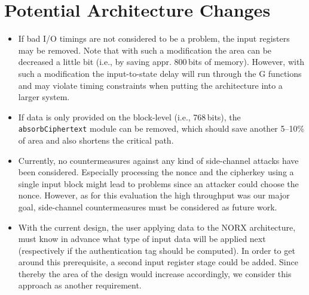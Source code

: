\documentclass[%
 halfparskip
]{scrartcl}
\begin{document}
\section{Potential Architecture Changes}

\begin{itemize}
\item If bad I/O timings are not considered to be a problem, the input
  registers may be removed. Note that with such a modification the
  area can be decreased a little bit (i.e., by saving appr. 800\,bits
  of memory). However, with such a modification the input-to-state
  delay will run through the G functions and may violate timing
  constraints when putting the architecture into a larger system.
\item If data is only provided on the block-level (i.e., 768\,bits),
  the \texttt{absorbCiphertext} module can be removed, which should
  save another 5--10\% of area and also shortens the critical path.
\item Currently, no countermeasures against any kind of side-channel
  attacks have been considered. Especially processing the nonce and
  the cipherkey using a single input block might lead to problems
  since an attacker could choose the nonce. However, as for this
  evaluation the high throughput was our major goal, side-channel
  countermeasures must be considered as future work.
\item With the current design, the user applying data to the NORX
  architecture, must know in advance what type of input data will be
  applied next (respectively if the authentication tag should be
  computed). In order to get around this prerequisite, a second input
  register stage could be added. Since thereby the area of the design
  would increase accordingly, we consider this approach as another
  requirement.
\end{itemize}
\end{document}

